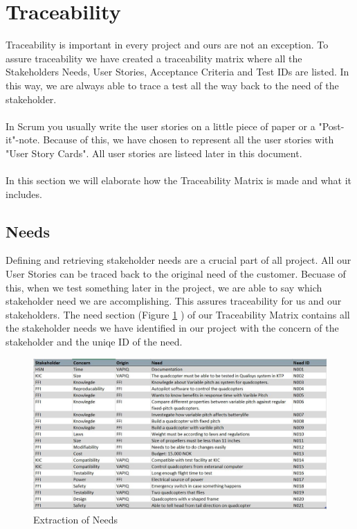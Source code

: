 \section{Traceability}
Traceability is important in every project and ours are not an exception. To assure traceability we have created a traceability matrix where all the Stakeholders Needs, User Stories, Acceptance Criteria and Test IDs are listed. In this way, we are always able to trace a test all the way back to the need of the stakeholder. \\
\\
In Scrum you usually write the user stories on a little piece of paper or a "Post-it"-note. Because of this, we have chosen to represent all the user stories with "User Story Cards". All user stories are listeed later in this document.  \\
\\
In this section we will elaborate how the Traceability Matrix is made and what it includes.

\subsection{Needs}
Defining and retrieving stakeholder needs are a crucial part of all project. All our User Stories can be traced back to the original need of the customer. Becuase of this, when we test something later in the project, we are able to say which stakeholder need we are accomplishing. This assures traceability for us and our stakeholders. The need section (Figure \ref{fig:needs} ) of our Traceability Matrix contains all the stakeholder needs we have identified in our project with the concern of the stakeholder and the uniqe ID of the need. 

\begin{figure}[h]
    \centering
        \includegraphics[width = 1\textwidth]{VAPIQ-PICTURES/Needs}
    \caption{Extraction of Needs}
    \label{fig:needs}
\end{figure}
\newpage

